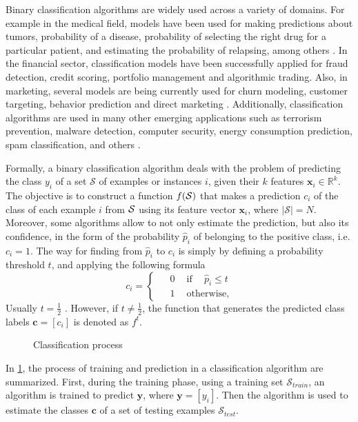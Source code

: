 Binary classification algorithms are widely used across a variety of domains. For example in the 
medical field, models have been used for making predictions about tumors, probability 
of a disease, probability of selecting the right drug for a particular patient, and estimating the 
probability of relapsing, among others \citep{Herland2014}. In the financial sector, classification 
models have been successfully applied for fraud detection, credit scoring, portfolio management and 
algorithmic trading. Also, in marketing, several models are being currently used for churn modeling, 
customer targeting, behavior prediction and direct marketing \citep{Baesens2014}. Additionally, 
classification algorithms are used in many other emerging applications such as terrorism 
prevention, malware detection, computer security, energy consumption prediction, spam 
classification, and others \citep{Kriegel2007}.

Formally, a binary classification algorithm deals with the problem	of predicting the class $y_i$ 
of a set $\mathcal{S}$ of examples or instances $i$, given their $k$ features \mbox{$\mathbf{x}_i 
\in \mathbb{R}^k$}. The objective is to construct a function $f(\cal{S})$ that makes a prediction 
$c_i$ of the class of each example $i$ from $\cal{S}$ using its feature vector $\mathbf{x}_i$, 
where $\vert \mathcal{S} \vert= N$. Moreover, some algorithms allow to not only estimate the 
prediction, but also its confidence, in the form of the probability $\hat p_i$ of belonging to the 
positive class, i.e. $c_i = 1$. The way for finding from $\hat p_i$ to $c_i$ is simply by defining 
a probability threshold $t$, and applying the following formula
\begin{equation}\label{eq_pred}
  c_i = 
  \begin{cases}
    \phantom{-}0 \phantom{-} \mbox{if} \phantom{-} \hat p_i \le t\\
    \phantom{-}1 \phantom{-}\mbox{otherwise,}
  \end{cases}
\end{equation}
Usually $t=\frac{1}{2}$ \citep{Hastie2009}. However, if $t \ne \frac{1}{2}$, the 
function that generates the predicted class labels $\mathbf{c}=[c_i]$ is denoted as 
$f^t$.

\begin{figure}
	\centering
	
  \caption{Classification process}
  \label{fig:2:1}
\end{figure}

In \figurename{ \ref{fig:2:1}}, the process of training and prediction in a classification 
algorithm are summarized. First, during the training phase, using a training set 
$\mathcal{S}_{train}$, an algorithm is trained to predict $\mathbf{y}$, where
$\mathbf{y}=[y_i]$. Then the algorithm is used to estimate the classes 
$\mathbf{c}$ of a set of testing examples $\mathcal{S}_{test}$.

